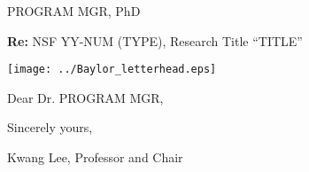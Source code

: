 \documentclass{letter}
\begin{document}
\begin{letter}{ %
PROGRAM MGR, PhD

\textbf{Re:} NSF YY-NUM (TYPE), Research Title ``TITLE''}
  \vspace*{-1.1in}
  \begin{center}\texttt{[image: ../Baylor\_letterhead.eps]}\end{center}



\opening{Dear Dr. PROGRAM MGR,}




\closing{Sincerely yours,}
\ccname{Kwang Lee, Professor and Chair}
\end{letter}
\end{document}
